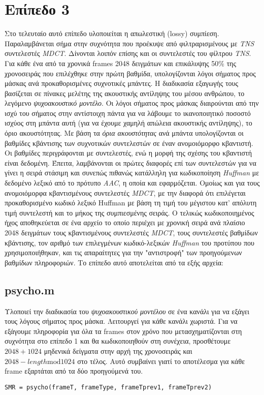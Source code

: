 \section*{Επίπεδο 3}
Στο τελευταίο αυτό επίπεδο υλοποιείται η απωλεστική (lossy) συμπίεση.
Παραλαμβάνεται σήμα στην συχνότητα που προέκυψε από φιλτραρισμένους
με \emph{TNS} συντελεστές \emph{MDCT}. Δίνονται λοιπόν επίσης και οι συντελεστές
του φίλτρου \emph{ΤΝS}. Για κάθε ένα από τα χρονικά frames 2048 δειγμάτων και
επικάλυψης 50\% της χρονοσειράς που επιλέχθηκε στην πρώτη βαθμίδα, υπολογίζονται
λόγοι σήματος προς μάσκας ανά προκαθορισμένες συχνοτικές μπάντες. Η διαδικασία
εξαγωγής τους βασίζεται σε πίνακες μελέτης της ακουστικής αντίληψης του μέσου
ανθρώπου, το λεγόμενο \emph{ψυχοακουστικό μοντέλο}. Οι λόγοι σήματος προς μάσκας
διαιρούνται από την ισχύ του σήματος στην αντίστοιχη πάντα για να λάβουμε το
ικανοποιητικό ποσοστό ισχύος στη μπάντα αυτή (για να έχουμε χαμηλή απώλεια
ακουστικής αντίληψης), το όριο ακουστότητας. Με βάση τα \emph{όρια ακουστότητας} ανά
μπάντα υπολογίζονται οι βαθμίδες κβάντισης των συχνοτικών συντελεστών σε έναν
ανομοιόμορφο κβαντιστή. Οι βαθμίδες περιγράφονται με συντελεστές, ενώ η μορφή
της σχέσης του κβαντιστή είναι δεδομένη. Έπειτα, λαμβάνονται οι πρώτες διαφορές
επί των συντελεστών για να γίνει η σειρά στάσιμη και συνεπώς πιθανώς κατάλληλη
για κωδικοποίηση \emph{Huffman} με δεδομένο λεξικό από το πρότυπο \emph{AAC},
η οποία και εφαρμόζεται. Ομοίως και για τους ανομοιόμορφα κβαντισμένους
συντελεστές \emph{MDCT}, με την διαφορά ότι επιλέγεται προκαθορισμένο κωδικό λεξικό
Huffman με βάση τη τιμή του μέγιστου κατ' απόλυτη τιμή συντελεστή και το μήκος
της συμπιεσμένης σειράς. Ο τελικώς κωδικοποιημένος ήχος αποθηκεύεται σε ένα
αρχείο το οποίο περιέχει με χρονική σειρά ανά πλαίσιο 2048 δειγμάτων τους
κβαντισμένους συντελεστές \emph{MDCT}, τους συντελεστές βαθμίδων κβάντισης, τον αριθμό
των επιλεγμένων κωδικό-λεξικών \emph{Huffman} του προτύπου που χρησιμοποιήθηκαν, και
τις απαραίτητες για την "αντιστροφή" των προηγούμενων βαθμίδων πληροφοριών.
Το επίπεδο αυτό αποτελείται από τα εξής αρχεία:

\subsection*{psycho.m}
Υλοποιεί την διαδικασία του \emph{ψυχοακουστικού μοντέλου} σε ένα κανάλι για να εξάγει
τους λόγους σήματος προς μάσκα. Λειτουργεί για κάθε κανάλι χωριστά. Για να εξάγουμε
πληροφορία για όλα τα frames στον χρόνο που μετασχηματίζονται στη συχνότητα στο
επίπεδο 1 και θα κωδικοποιηθούν στη συνέχεια, προσθέτουμε $2048 + 1024$ μηδενικά
δείγματα στην αρχή της χρονοσειράς και $2048 - length \text{mod} 1024$ στο τέλος.
Αυτό συμβαίνει γιατί το αποτέλεσμα για κάθε frame εξαρτάται από τα δύο προηγούμενά του.
\begin{center}
  \verb|SMR = psycho(frameT, frameType, frameTprev1, frameTprev2)|
\end{center}

